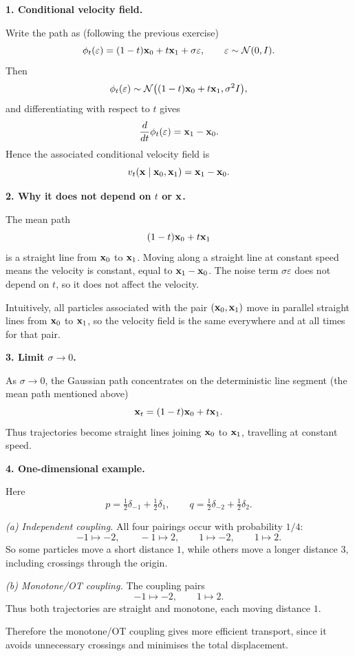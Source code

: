 \begin{solution}

\textbf{1. Conditional velocity field.}

Write the path as (following the previous exercise)
\[
\phi_t(\varepsilon)=(1-t){ \mathbf{x}}_0+t{ \mathbf{x}}_1+\sigma \varepsilon,
\qquad
\varepsilon\sim\mathcal N(0,I).
\]
Then
\[
\phi_t(\varepsilon)\sim \mathcal N\bigl((1-t){ \mathbf{x}}_0+t{ \mathbf{x}}_1,\sigma^2I\bigr),
\]
and differentiating with respect to \(t\) gives
\[
\frac{d}{dt}\phi_t(\varepsilon)={ \mathbf{x}}_1-{ \mathbf{x}}_0.
\]
Hence the associated conditional velocity field is
\[
v_t({ \mathbf{x}}\mid { \mathbf{x}}_0,{ \mathbf{x}}_1)={ \mathbf{x}}_1-{ \mathbf{x}}_0.
\]

\bigskip

\textbf{2. Why it does not depend on \(t\) or \({ \mathbf{x}}\).}

The mean path
\[
(1-t){ \mathbf{x}}_0+t{ \mathbf{x}}_1
\]
is a straight line from \({ \mathbf{x}}_0\) to \({ \mathbf{x}}_1\). Moving along a straight line at constant speed means the velocity is constant, equal to \({ \mathbf{x}}_1-{ \mathbf{x}}_0\). The noise term \(\sigma\varepsilon\) does not depend on \(t\), so it does not affect the velocity. 

Intuitively, all particles associated with the pair \(({ \mathbf{x}}_0,{ \mathbf{x}}_1)\) move in parallel straight lines from \({ \mathbf{x}}_0\) to \({ \mathbf{x}}_1\), so the velocity field is the same everywhere and at all times for that pair.

\bigskip

\textbf{3. Limit \(\sigma\to 0\).}

As \(\sigma\to 0\), the Gaussian path concentrates on the deterministic line segment (the mean path mentioned above)
\[
{ \mathbf{x}}_t=(1-t){ \mathbf{x}}_0+t{ \mathbf{x}}_1.
\]
Thus trajectories become straight lines joining \({ \mathbf{x}}_0\) to \({ \mathbf{x}}_1\), travelling at constant speed.

\bigskip

\textbf{4. One-dimensional example.}

Here
\[
p=\tfrac12\delta_{-1}+\tfrac12\delta_{1},
\qquad
q=\tfrac12\delta_{-2}+\tfrac12\delta_{2}.
\]

\emph{(a) Independent coupling.}
All four pairings occur with probability \(1/4\):
\[
-1\mapsto -2,\qquad -1\mapsto 2,\qquad 1\mapsto -2,\qquad 1\mapsto 2.
\]
So some particles move a short distance \(1\), while others move a longer distance \(3\), including crossings through the origin.

\emph{(b) Monotone/OT coupling.}
The coupling pairs
\[
-1\mapsto -2,
\qquad
1\mapsto 2.
\]
Thus both trajectories are straight and monotone, each moving distance \(1\).

Therefore the monotone/OT coupling gives more efficient transport, since it avoids unnecessary crossings and minimises the total displacement.

\end{solution}
